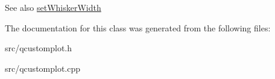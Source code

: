 \begin{DoxySeeAlso}{See also}
\hyperlink{classQCPStatisticalBox_adf378812446bd66f34d1f7f293d991cd}{set\+Whisker\+Width} 
\end{DoxySeeAlso}


The documentation for this class was generated from the following files\+:\begin{DoxyCompactItemize}
\item 
src/qcustomplot.\+h\item 
src/qcustomplot.\+cpp\end{DoxyCompactItemize}
